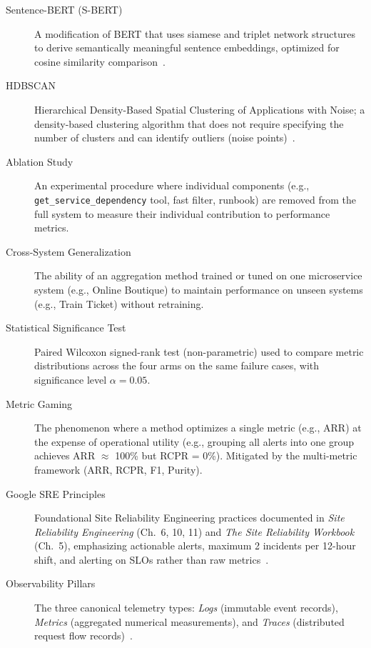 \begin{description}
\item[Sentence-BERT (S-BERT)]
A modification of BERT that uses siamese and triplet network structures to derive semantically meaningful sentence embeddings, optimized for cosine similarity comparison~\cite{sbert}.

\item[HDBSCAN]
Hierarchical Density-Based Spatial Clustering of Applications with Noise; a density-based clustering algorithm that does not require specifying the number of clusters and can identify outliers (noise points)~\cite{hdbscan}.


\item[Ablation Study]
An experimental procedure where individual components (e.g., \texttt{get\_service\_dependency} tool, fast filter, runbook) are removed from the full system to measure their individual contribution to performance metrics.

\item[Cross-System Generalization]
The ability of an aggregation method trained or tuned on one microservice system (e.g., Online Boutique) to maintain performance on unseen systems (e.g., Train Ticket) without retraining.

\item[Statistical Significance Test]
Paired Wilcoxon signed-rank test (non-parametric) used to compare metric distributions across the four arms on the same failure cases, with significance level $\alpha = 0.05$.

\item[Metric Gaming]
The phenomenon where a method optimizes a single metric (e.g., ARR) at the expense of operational utility (e.g., grouping all alerts into one group achieves ARR $\approx$ 100\% but RCPR = 0\%). Mitigated by the multi-metric framework (ARR, RCPR, F1, Purity).


\item[Google SRE Principles]
Foundational Site Reliability Engineering practices documented in \textit{Site Reliability Engineering} (Ch.~6, 10, 11) and \textit{The Site Reliability Workbook} (Ch.~5), emphasizing actionable alerts, maximum 2 incidents per 12-hour shift, and alerting on SLOs rather than raw metrics~\cite{google-sre-book, google-sre-workbook}.

\item[Observability Pillars]
The three canonical telemetry types: \textit{Logs} (immutable event records), \textit{Metrics} (aggregated numerical measurements), and \textit{Traces} (distributed request flow records)~\cite{grafana2025}.

\end{description}

